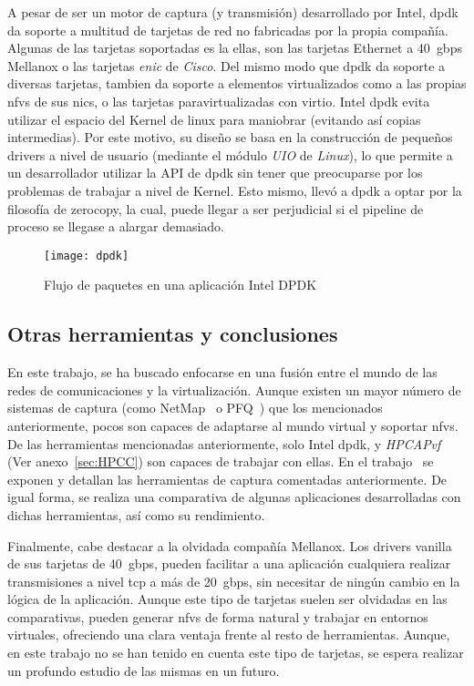A pesar de ser un motor de captura (y transmisión) desarrollado por Intel, \gls{dpdk} da soporte a multitud de tarjetas de red no fabricadas por la propia compañía. Algunas de las tarjetas soportadas es la ellas, son las tarjetas Ethernet a 40~\gls{gbps} Mellanox o las tarjetas \textit{enic} de \textit{Cisco}. Del mismo modo que \gls{dpdk} da soporte a diversas tarjetas, tambien da soporte a elementos virtualizados como a las propias \glspl{nfv} de sus \glspl{nic}, o las tarjetas paravirtualizadas con \gls{virtio}.
Intel \gls{dpdk} evita utilizar el espacio del Kernel de linux para maniobrar (evitando así copias intermedias). Por este motivo, su diseño se basa en la construcción de pequeños drivers a nivel de usuario (mediante el módulo \textit{UIO} de \textit{Linux}), lo que permite a un desarrollador utilizar la API de \gls{dpdk} sin tener que preocuparse por los problemas de trabajar a nivel de Kernel.
Esto mismo, llevó a \gls{dpdk} a optar por la filosofía de \gls{zerocopy}, la cual, puede llegar a ser perjudicial si el pipeline de proceso se llegase a alargar demasiado.


\begin{figure}[!bth]
\centering
\texttt{[image: dpdk]}
\caption{Flujo de paquetes en una aplicación Intel DPDK}
\label{fig:flow:dpdk}
\end{figure}


\subsection{Otras herramientas y conclusiones}

En este trabajo, se ha buscado enfocarse en una fusión entre el mundo de las redes de comunicaciones y la virtualización. Aunque existen un mayor número de sistemas de captura (como NetMap~\cite{rizzo12usenix,rizzo12cacm,rizzoNETWORK14} o PFQ~\cite{bonelli12pam}) que los mencionados anteriormente, pocos son capaces de adaptarse al mundo virtual y soportar \glspl{nfv}. De las herramientas mencionadas anteriormente, solo Intel \gls{dpdk}, y \textit{HPCAPvf} (Ver anexo~\ref{sec:HPCC}) son capaces de trabajar con ellas.
En el trabajo~\cite{7101227} se exponen y detallan las herramientas de captura comentadas anteriormente. De igual forma, se realiza una comparativa de algunas aplicaciones desarrolladas con dichas herramientas, así como su rendimiento.

Finalmente, cabe destacar a la olvidada compañía Mellanox. Los drivers \gls{vanilla} de sus tarjetas de 40~\gls{gbps}, pueden facilitar a una aplicación cualquiera realizar transmisiones a nivel tcp a más de 20~\gls{gbps}, sin necesitar de ningún cambio en la lógica de la aplicación. Aunque este tipo de tarjetas suelen ser olvidadas en las comparativas, pueden generar \glspl{nfv} de forma natural y trabajar en entornos virtuales, ofreciendo una clara ventaja frente al resto de herramientas. Aunque, en este trabajo no se han tenido en cuenta este tipo de tarjetas, se espera realizar un profundo estudio de las mismas en un futuro.

